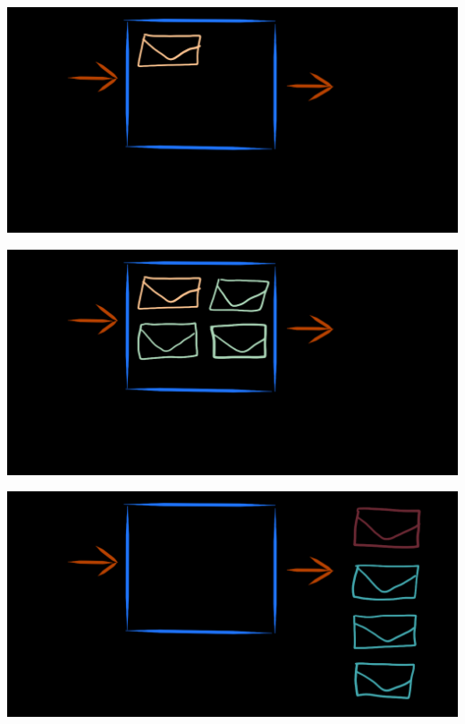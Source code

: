 \documentclass[fleqn,xcolor={usenames,dvipsnames}]{beamer} %
\begin{document}
\begin{frame}
\begin{center}
\includegraphics[scale=.23]{pics/blending1}
\end{center}
\end{frame}

\begin{frame}
\begin{center}
\includegraphics[scale=.23]{pics/blending2}
\end{center}
\end{frame}

\begin{frame}
\begin{center}
\includegraphics[scale=.23]{pics/blending3}
\end{center}
\end{frame}
\end{document}
